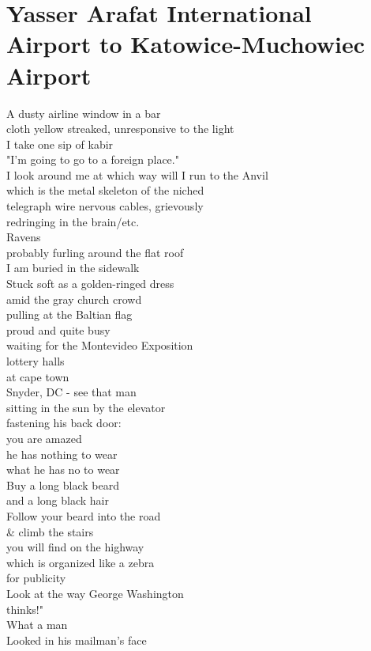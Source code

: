 \documentclass[smalldemyvopaper,11pt,twoside,onecolumn,openright,extrafontsizes]{memoir}
\begin{document}
\chapter{Yasser Arafat International Airport to Katowice-Muchowiec Airport}
A dusty airline window in a bar
\\cloth yellow streaked, unresponsive to the light
\\I take one sip of kabir
\\"I'm going to go to a foreign place."
\\I look around me at which way will I run to the Anvil
\\which is the metal skeleton of the niched
\\telegraph wire nervous cables, grievously
\\redringing in the brain/etc.
\\Ravens
\\probably furling around the flat roof
\\I am buried in the sidewalk
\\Stuck soft as a golden-ringed dress
\\amid the gray church crowd
\\pulling at the Baltian flag
\\proud and quite busy
\\waiting for the Montevideo Exposition
\\lottery halls
\\at cape town
\\Snyder, DC - see that man
\\sitting in the sun by the elevator
\\fastening his back door:
\\you are amazed
\\he has nothing to wear
\\what he has no to wear
\\Buy a long black beard
\\and a long black hair
\\Follow your beard into the road
\\\& climb the stairs
\\you will find on the highway
\\which is organized like a zebra
\\for publicity
\\Look at the way George Washington
\\thinks!"
\\What a man
\\Looked in his mailman's face
\end{document}
